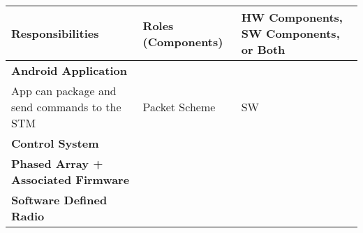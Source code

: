 \documentclass[RRC.tex]{subfiles}
\begin{document}
\bigskip

\begin{center}
	\begin{tabular}{ | p{5cm} | p{5cm} | p{5cm} |}
		\hline
		Responsibilities & Roles (Components) & HW Components, SW Components, or Both \\ \hline
		\textbf{Android Application} & & \\ \hline
		App can package and send commands to the STM & Packet Scheme & SW  \\ \hline
		\textbf{Control System} & & \\ \hline
		\textbf{Phased Array + Associated Firmware} & & \\ \hline
		\textbf{Software Defined Radio} & & \\ \hline
		
	\end{tabular}
\end{center}
\end{document}
